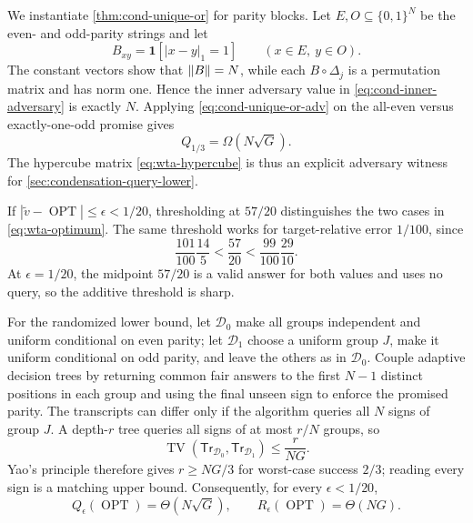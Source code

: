 We instantiate \cref{thm:cond-unique-or} for parity blocks.
Let $E,O\subseteq\{0,1\}^N$ be the even- and odd-parity strings and let
\begin{equation}
 B_{xy}=\mathbf1[|x-y|_1=1]\qquad(x\in E,\ y\in O).
 \label{eq:wta-hypercube}
\end{equation}
The constant vectors show that $\lVert B\rVert=N$, while each
$B\circ\Delta_j$ is a permutation matrix and has norm one.  Hence the inner
adversary value in \eqref{eq:cond-inner-adversary} is exactly $N$.
Applying \eqref{eq:cond-unique-or-adv} on the all-even versus
exactly-one-odd promise gives
\begin{equation}
 Q_{1/3}=\Omega(N\sqrt G).
 \label{eq:wta-quantum-lower}
\end{equation}
The hypercube matrix \eqref{eq:wta-hypercube} is thus an explicit
adversary witness for \cref{sec:condensation-query-lower}.

If $|\widetilde v-\operatorname{OPT}|\le\epsilon<1/20$, thresholding at
$57/20$ distinguishes the two cases in \eqref{eq:wta-optimum}.  The same
threshold works for target-relative error $1/100$, since
\begin{equation}
 \frac{101}{100}\frac{14}5<\frac{57}{20}
 <\frac{99}{100}\frac{29}{10}.
 \label{eq:wta-relative-threshold}
\end{equation}
At $\epsilon=1/20$, the midpoint $57/20$ is a valid answer for both values
and uses no query, so the additive threshold is sharp.

For the randomized lower bound, let $\mathcal D_0$ make all groups
independent and uniform conditional on even parity; let $\mathcal D_1$
choose a uniform group $J$, make it uniform conditional on odd parity, and
leave the others as in $\mathcal D_0$.  Couple adaptive decision trees by returning common fair answers to the first $N-1$ distinct positions in each
group and using the final unseen sign to enforce the promised parity.  The
transcripts can differ only if the algorithm queries all $N$ signs of
group $J$.  A depth-$r$ tree queries all signs of at most $r/N$ groups, so
\begin{equation}
 \operatorname{TV}(\mathsf{Tr}_{\mathcal D_0},
                    \mathsf{Tr}_{\mathcal D_1})\le\frac r{NG}.
 \label{eq:wta-yao-coupling}
\end{equation}
Yao's principle therefore gives $r\ge NG/3$ for worst-case success $2/3$;
reading every sign is a matching upper bound.  Consequently, for every
$\epsilon<1/20$,
\begin{equation}
 \boxed{Q_\epsilon(\operatorname{OPT})=\Theta(N\sqrt G),
 \qquad R_\epsilon(\operatorname{OPT})=\Theta(NG).}
 \label{eq:wta-value-complexity}
\end{equation}

